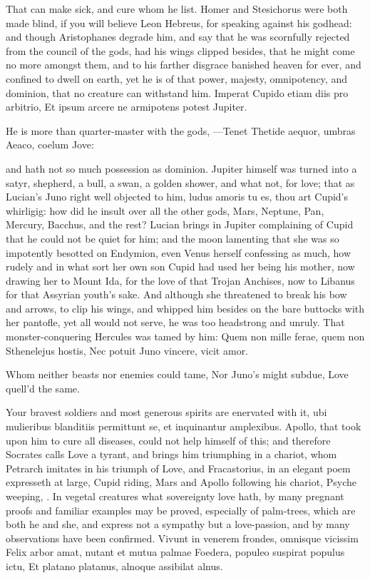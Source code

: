 That can make sick, and cure whom he list. Homer and Stesichorus were
both made blind, if you will believe Leon Hebreus, for speaking
against his godhead: and though Aristophanes degrade him, and say that
he was scornfully rejected from the council of the gods, had his
wings clipped besides, that he might come no more amongst them, and to
his farther disgrace banished heaven for ever, and confined to dwell on
earth, yet he is of that power, majesty, omnipotency, and
dominion, that no creature can withstand him.
Imperat Cupido etiam diis pro arbitrio,
Et ipsum arcere ne armipotens potest Jupiter.

He is more than quarter-master with the gods,
---Tenet
Thetide aequor, umbras Aeaco, coelum Jove:

and hath not so much possession as dominion. Jupiter himself was turned
into a satyr, shepherd, a bull, a swan, a golden shower, and what not,
for love; that as Lucian's Juno right well objected to him, ludus
amoris tu es, thou art Cupid's whirligig: how did he insult over all
the other gods, Mars, Neptune, Pan, Mercury, Bacchus, and the rest?
 Lucian brings in Jupiter complaining of Cupid that he could not
be quiet for him; and the moon lamenting that she was so impotently
besotted on Endymion, even Venus herself confessing as much, how rudely
and in what sort her own son Cupid had used her being his mother,
now drawing her to Mount Ida, for the love of that Trojan Anchises, now
to Libanus for that Assyrian youth's sake. And although she threatened
to break his bow and arrows, to clip his wings, and whipped him
besides on the bare buttocks with her pantofle, yet all would not
serve, he was too headstrong and unruly. That monster-conquering
Hercules was tamed by him:
Quem non mille ferae, quem non Sthenelejus hostis,
Nec potuit Juno vincere, vicit amor.

Whom neither beasts nor enemies could tame,
Nor Juno's might subdue, Love quell'd the same.

Your bravest soldiers and most generous spirits are enervated with it,
ubi mulieribus blanditiis permittunt se, et inquinantur
amplexibus. Apollo, that took upon him to cure all diseases,
could not help himself of this; and therefore Socrates
calls Love a tyrant, and brings him triumphing in a chariot, whom
Petrarch imitates in his triumph of Love, and Fracastorius, in an
elegant poem expresseth at large, Cupid riding, Mars and Apollo
following his chariot, Psyche weeping, \etc{}.
In vegetal creatures what sovereignty love hath, by many pregnant
proofs and familiar examples may be proved, especially of palm-trees,
which are both he and she, and express not a sympathy but a
love-passion, and by many observations have been confirmed.
Vivunt in venerem frondes, omnisque vicissim
Felix arbor amat, nutant et mutua palmae
Foedera, populeo suspirat populus ictu,
Et platano platanus, alnoque assibilat alnus.

